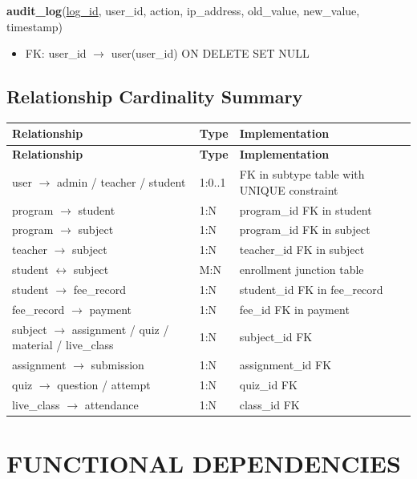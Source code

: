 \documentclass[12pt,a4paper]{report}
\begin{document}
\textbf{audit\_log}(\underline{log\_id}, user\_id, action, ip\_address, old\_value, new\_value, timestamp)
\begin{itemize}[noitemsep,topsep=2pt]
    \item FK: user\_id $\rightarrow$ user(user\_id) ON DELETE SET NULL
\end{itemize}

\subsection{Relationship Cardinality Summary}

\begin{longtable}{|L{5cm}|C{2.5cm}|L{5.5cm}|}
\hline
\textbf{Relationship} & \textbf{Type} & \textbf{Implementation} \\
\hline
\endfirsthead
\hline
\textbf{Relationship} & \textbf{Type} & \textbf{Implementation} \\
\hline
\endhead
user $\rightarrow$ admin / teacher / student & 1:0..1 & FK in subtype table with UNIQUE constraint \\
\hline
program $\rightarrow$ student & 1:N & program\_id FK in student \\
\hline
program $\rightarrow$ subject & 1:N & program\_id FK in subject \\
\hline
teacher $\rightarrow$ subject & 1:N & teacher\_id FK in subject \\
\hline
student $\leftrightarrow$ subject & M:N & enrollment junction table \\
\hline
student $\rightarrow$ fee\_record & 1:N & student\_id FK in fee\_record \\
\hline
fee\_record $\rightarrow$ payment & 1:N & fee\_id FK in payment \\
\hline
subject $\rightarrow$ assignment / quiz / material / live\_class & 1:N & subject\_id FK \\
\hline
assignment $\rightarrow$ submission & 1:N & assignment\_id FK \\
\hline
quiz $\rightarrow$ question / attempt & 1:N & quiz\_id FK \\
\hline
live\_class $\rightarrow$ attendance & 1:N & class\_id FK \\
\hline
\end{longtable}

\section{FUNCTIONAL DEPENDENCIES}
\end{document}
